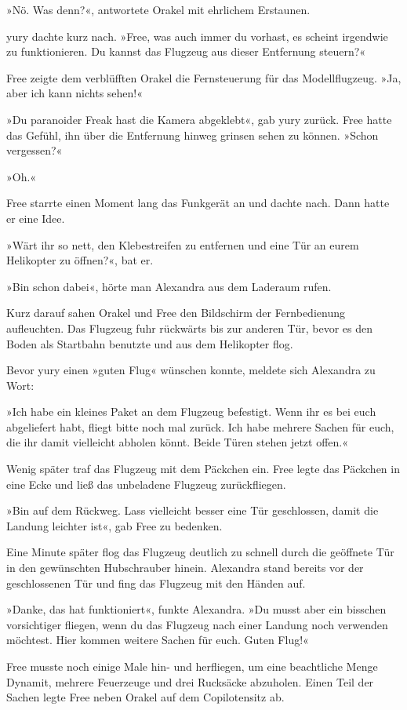 »Nö. Was denn?«, antwortete Orakel mit ehrlichem Erstaunen.

yury dachte kurz nach. »Free, was auch immer du vorhast, es scheint irgendwie zu funktionieren. Du kannst das Flugzeug aus dieser Entfernung steuern?«

Free zeigte dem verblüfften Orakel die Fernsteuerung für das Modellflugzeug. »Ja, aber ich kann nichts sehen!«

»Du paranoider Freak hast die Kamera abgeklebt«, gab yury zurück. Free hatte das Gefühl, ihn über die Entfernung hinweg grinsen sehen zu können. »Schon vergessen?«

»Oh.«

Free starrte einen Moment lang das Funkgerät an und dachte nach. Dann hatte er eine Idee.

»Wärt ihr so nett, den Klebestreifen zu entfernen und eine Tür an eurem Helikopter zu öffnen?«, bat er.

»Bin schon dabei«, hörte man Alexandra aus dem Laderaum rufen.

Kurz darauf sahen Orakel und Free den Bildschirm der Fernbedienung aufleuchten. Das Flugzeug fuhr rückwärts bis zur anderen Tür, bevor es den Boden als Startbahn benutzte und aus dem Helikopter flog.

Bevor yury einen »guten Flug« wünschen konnte, meldete sich Alexandra zu Wort:

»Ich habe ein kleines Paket an dem Flugzeug befestigt. Wenn ihr es bei euch abgeliefert habt, fliegt bitte noch mal zurück. Ich habe mehrere Sachen für euch, die ihr damit vielleicht abholen könnt. Beide Türen stehen jetzt offen.«

Wenig später traf das Flugzeug mit dem Päckchen ein. Free legte das Päckchen in eine Ecke und ließ das unbeladene Flugzeug zurückfliegen.

»Bin auf dem Rückweg. Lass vielleicht besser eine Tür geschlossen, damit die Landung leichter ist«, gab Free zu bedenken.

Eine Minute später flog das Flugzeug deutlich zu schnell durch die geöffnete Tür in den gewünschten Hubschrauber hinein. Alexandra stand bereits vor der geschlossenen Tür und fing das Flugzeug mit den Händen auf.

»Danke, das hat funktioniert«, funkte Alexandra. »Du musst aber ein bisschen vorsichtiger fliegen, wenn du das Flugzeug nach einer Landung noch verwenden möchtest. Hier kommen weitere Sachen für euch. Guten Flug!«

Free musste noch einige Male hin- und herfliegen, um eine beachtliche Menge Dynamit, mehrere Feuerzeuge und drei Rucksäcke abzuholen. Einen Teil der Sachen legte Free neben Orakel auf dem Copilotensitz ab.

